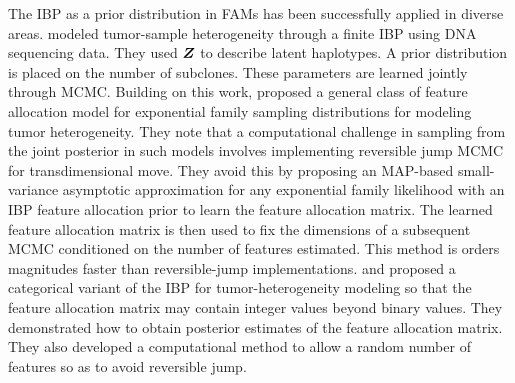\documentclass[12pt,]{article}
\newcommand{\bZ}{\mbox{\boldmath $Z$}}
\begin{document}
%
%
% 
%



The IBP as a prior distribution in FAMs has been
successfully applied in diverse areas. \cite{lee2015bayesian} modeled
tumor-sample heterogeneity through a finite IBP using DNA sequencing data.  
They used $\bZ$ to describe latent haplotypes. A prior distribution is placed 
on the number of
subclones. These parameters are learned jointly through MCMC.  Building on this
work, \cite{xu2015mad} proposed a general class of feature allocation model for
exponential family sampling distributions for modeling tumor heterogeneity.
They note that a computational challenge in sampling from the joint posterior
in such models involves implementing reversible jump MCMC
\citep{green1995reversible} for transdimensional move. They avoid this by
proposing an MAP-based small-variance asymptotic approximation for any
exponential family likelihood with an IBP feature allocation prior to learn the
feature allocation matrix. The learned feature allocation matrix is then used
to fix the dimensions of a subsequent MCMC conditioned on the number of
features estimated. This method is orders magnitudes faster than
reversible-jump implementations. 
\cite{sengupta2014bayclone} and \cite{lee2016bayesian} proposed a categorical 
variant of the IBP for tumor-heterogeneity modeling so that
the feature allocation matrix may contain integer values beyond binary values.
They demonstrated how to obtain posterior estimates of the feature allocation
matrix. They also developed a computational method to allow a random number of features so
as to avoid reversible jump.
\end{document}
